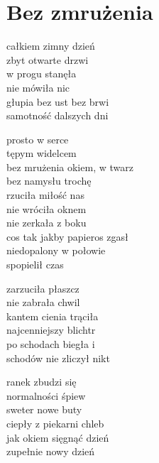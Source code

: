 \section{Bez zmrużenia}
\begin{text}
całkiem zimny dzień\\
zbyt otwarte drzwi\\
w progu stanęła\\
nie mówiła nic\\
głupia bez ust bez brwi\\
samotność dalszych dni

\vin prosto w serce\\
\vin tępym widelcem\\
\vin bez mrużenia okiem, w twarz\\
\vin bez namysłu trochę\\
\vin rzuciła miłość nas\\
\vin nie wróciła oknem\\
\vin nie zerkała z boku\\
\vin cos tak jakby papieros zgasł\\
\vin niedopalony w połowie\\
\vin spopielił czas

zarzuciła płaszcz\\
nie zabrała chwil\\
kantem cienia trąciła\\
najcenniejszy blichtr\\
po schodach biegła i\\
schodów nie zliczył nikt

ranek zbudzi się\\
normalności śpiew\\
sweter nowe buty\\
ciepły z piekarni chleb\\
jak okiem sięgnąć dzień\\
zupełnie nowy dzień
\end{text}
